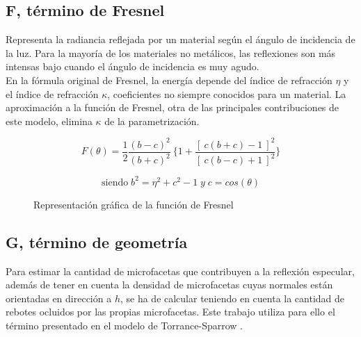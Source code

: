             \subsection*{F, t\'ermino de Fresnel}
            Representa la radiancia reflejada por un material seg\'un el \'angulo de incidencia
            de la luz. Para la mayor\'ia de los materiales no met\'alicos, las reflexiones son m\'as intensas bajo cuando el \'angulo
            de incidencia es muy agudo.\\

            En la f\'ormula original de Fresnel, la energ\'ia depende del \'indice de refracci\'on $\eta$ y el \'indice de refracci\'on
            $\kappa$, coeficientes no siempre conocidos para un material. La aproximaci\'on a la funci\'on de Fresnel, otra de las
            principales contribuciones de este modelo, elimina $\kappa$ de la parametrizaci\'on.

            $$
            F(\theta) = 
            \frac{1}{2}
            \frac{(b - c)^2}{(b + c)^2}\
            \bigg\{
                1 +
                \frac{[ \ c(b + c) - 1 \ ]^2}{[ \ c(b - c) + 1 \ ]^2}
            \bigg\}
            $$

            \begin{equation}
                \textrm{siendo} \; b^2 = \eta^2 + c^2 - 1 \; y \; c = cos(\theta)
            \end{equation}
    
            \begin{figure}[H]
                \vspace{0.5cm}
                \centering
                \caption{Representaci\'on gr\'afica de la funci\'on de Fresnel}
                \vspace{0.5cm}
            \end{figure}
            \singlespacing

    
            \subsection*{G, t\'ermino de geometr\'ia}
            Para estimar la cantidad de microfacetas que contribuyen a la reflexi\'on especular, adem\'as de tener en cuenta
            la densidad de microfacetas cuyas normales est\'an orientadas en direcci\'on a $h$, se ha de calcular teniendo en
            cuenta la cantidad de rebotes ocluidos por las propias microfacetas. Este trabajo utiliza para ello el t\'ermino
            presentado en el modelo de Torrance-Sparrow \autocite{torrancesparrow}.\\

